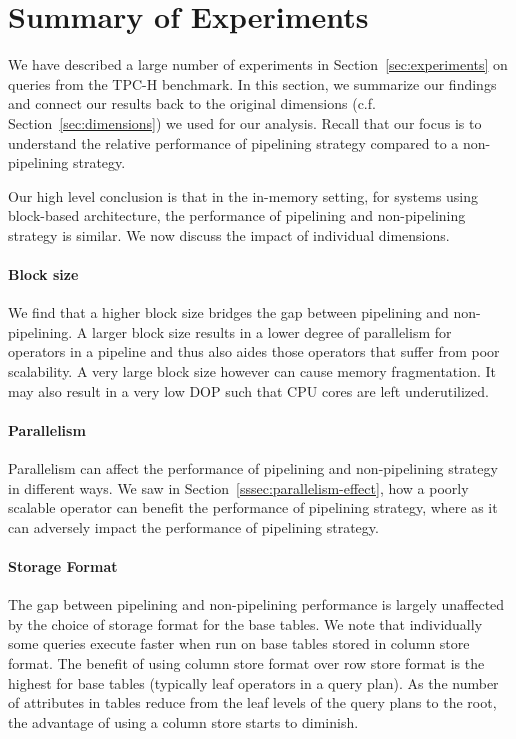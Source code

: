 \section{Summary of Experiments}\label{sec:experiment-summary}
We have described a large number of experiments in Section~\ref{sec:experiments} on queries from the TPC-H benchmark.
In this section, we summarize our findings and connect our results back to the original dimensions (c.f. Section~\ref{sec:dimensions}) we used for our analysis.
Recall that our focus is to understand the relative performance of pipelining strategy compared to a non-pipelining strategy.

Our high level conclusion is that in the in-memory setting, for systems using block-based architecture, the performance of pipelining and non-pipelining strategy is similar.
We now discuss the impact of individual dimensions.

\paragraph*{\textbf{Block size}}
We find that a higher block size bridges the gap between pipelining and non-pipelining. 
A larger block size results in a lower degree of parallelism for operators in a pipeline and thus also aides those operators that suffer from poor scalability. 
A very large block size however can cause memory fragmentation.
It may also result in a very low DOP such that CPU cores are left underutilized. 

\paragraph*{\textbf{Parallelism}}
Parallelism can affect the performance of pipelining and non-pipelining strategy in different ways. 
We saw in Section~\ref{sssec:parallelism-effect}, how a poorly scalable operator can benefit the performance of pipelining strategy, where as it can adversely impact the performance of pipelining strategy.

\paragraph*{\textbf{Storage Format}}
The gap between pipelining and non-pipelining performance is largely unaffected by the choice of storage format for the base tables.
We note that individually some queries execute faster when run on base tables stored in column store format. 
The benefit of using column store format over row store format is the highest for base tables (typically leaf operators in a query plan).
As the number of attributes in tables reduce from the leaf levels of the query plans to the root, the advantage of using a column store starts to diminish. 

